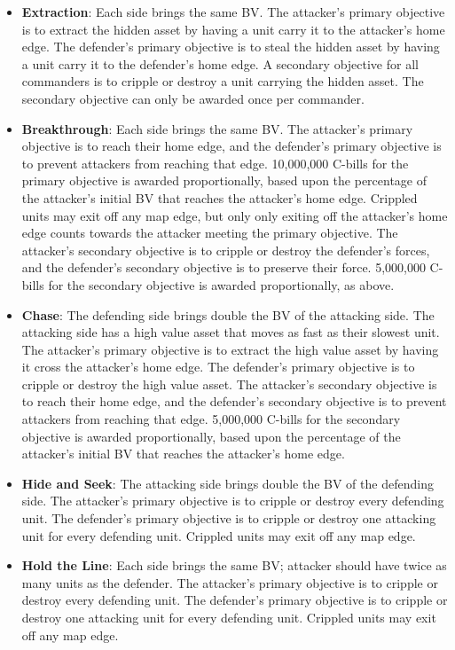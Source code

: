 \documentclass[UTF8]{article}
\begin{document}
\begin{itemize}

\item {\bf Extraction}: Each side brings the same BV.
The attacker's primary objective is to extract the hidden asset by having a unit carry it to the attacker's home edge.
The defender's primary objective is to steal the hidden asset by having a unit carry it to the defender's home edge.
A secondary objective for all commanders is to cripple or destroy a unit carrying the hidden asset.
The secondary objective can only be awarded once per commander.

\item {\bf Breakthrough}: Each side brings the same BV.
The attacker's primary objective is to reach their home edge, and the defender's primary objective is to prevent attackers from reaching that edge.
10,000,000 C-bills for the primary objective is awarded proportionally, based upon the percentage of the attacker's initial BV that reaches the attacker's home edge.
Crippled units may exit off any map edge, but only only exiting off the attacker's home edge counts towards the attacker meeting the primary objective.
The attacker's secondary objective is to cripple or destroy the defender's forces, and the defender's secondary objective is to preserve their force.
5,000,000 C-bills for the secondary objective is awarded proportionally, as above. 

\item {\bf Chase}: The defending side brings double the BV of the attacking side.
The attacking side has a high value asset that moves as fast as their slowest unit.
The attacker's primary objective is to extract the high value asset by having it cross the attacker's home edge.
The defender's primary objective is to cripple or destroy the high value asset.
The attacker's secondary objective is to reach their home edge, and the defender's secondary objective is to prevent attackers from reaching that edge.
5,000,000 C-bills for the secondary objective is awarded proportionally, based upon the percentage of the attacker's initial BV that reaches the attacker's home edge.

\item {\bf Hide and Seek}: The attacking side brings double the BV of the defending side.
The attacker's primary objective is to cripple or destroy every defending unit.
The defender's primary objective is to cripple or destroy one attacking unit for every defending unit.
Crippled units may exit off any map edge.

\item {\bf Hold the Line}: Each side brings the same BV; attacker should have twice as many units as the defender.
The attacker's primary objective is to cripple or destroy every defending unit.
The defender's primary objective is to cripple or destroy one attacking unit for every defending unit.
Crippled units may exit off any map edge.

\end{itemize}
\end{document}
